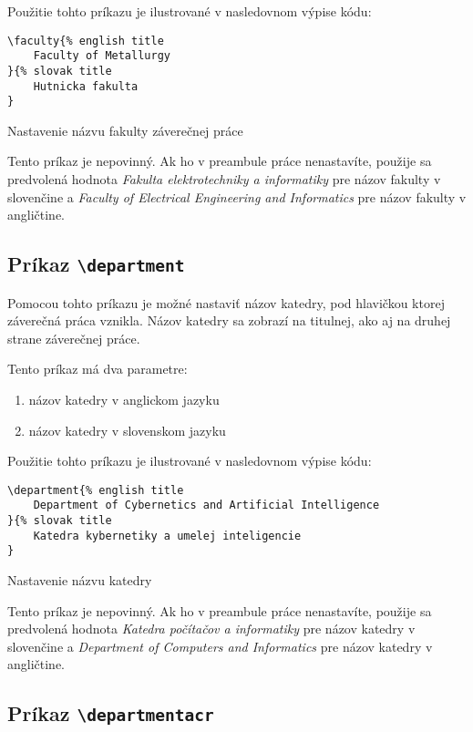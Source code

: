 Použitie tohto príkazu je ilustrované v nasledovnom výpise kódu:

\begin{listing}[ht]
\begin{verbatim}
\faculty{% english title
    Faculty of Metallurgy
}{% slovak title
    Hutnicka fakulta
}
\end{verbatim}
\caption{Nastavenie názvu fakulty záverečnej práce}
\end{listing}

Tento príkaz je nepovinný. Ak ho v preambule práce nenastavíte, použije sa predvolená hodnota {\it Fakulta elektrotechniky a informatiky} pre názov fakulty v slovenčine a {\it Faculty of Electrical Engineering and Informatics} pre názov fakulty v angličtine.


\subsection{Príkaz {\tt \textbackslash{}department}}

Pomocou tohto príkazu je možné nastaviť názov katedry, pod hlavičkou ktorej záverečná práca vznikla. Názov katedry sa zobrazí na titulnej, ako aj na druhej strane záverečnej práce.

Tento príkaz má dva parametre:
\begin{enumerate}
    \item názov katedry v anglickom jazyku
    \item názov katedry v slovenskom jazyku
\end{enumerate}

Použitie tohto príkazu je ilustrované v nasledovnom výpise kódu:

\begin{listing}[ht]
\begin{verbatim}
\department{% english title
    Department of Cybernetics and Artificial Intelligence
}{% slovak title
    Katedra kybernetiky a umelej inteligencie
}
\end{verbatim}
\caption{Nastavenie názvu katedry}
\end{listing}

Tento príkaz je nepovinný. Ak ho v preambule práce nenastavíte, použije sa predvolená hodnota {\it Katedra počítačov a informatiky} pre názov katedry v slovenčine a {\it Department of Computers and Informatics} pre názov katedry v angličtine.


\subsection{Príkaz {\tt \textbackslash{}departmentacr}}

